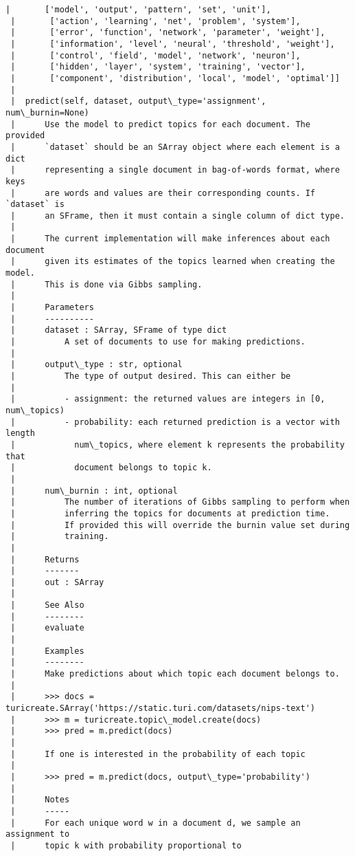 \documentclass[11pt]{ctexart}
\begin{document}
\begin{Verbatim}[commandchars=\\\{\}]
 |       ['model', 'output', 'pattern', 'set', 'unit'],
 |       ['action', 'learning', 'net', 'problem', 'system'],
 |       ['error', 'function', 'network', 'parameter', 'weight'],
 |       ['information', 'level', 'neural', 'threshold', 'weight'],
 |       ['control', 'field', 'model', 'network', 'neuron'],
 |       ['hidden', 'layer', 'system', 'training', 'vector'],
 |       ['component', 'distribution', 'local', 'model', 'optimal']]
 |  
 |  predict(self, dataset, output\_type='assignment', num\_burnin=None)
 |      Use the model to predict topics for each document. The provided
 |      `dataset` should be an SArray object where each element is a dict
 |      representing a single document in bag-of-words format, where keys
 |      are words and values are their corresponding counts. If `dataset` is
 |      an SFrame, then it must contain a single column of dict type.
 |      
 |      The current implementation will make inferences about each document
 |      given its estimates of the topics learned when creating the model.
 |      This is done via Gibbs sampling.
 |      
 |      Parameters
 |      ----------
 |      dataset : SArray, SFrame of type dict
 |          A set of documents to use for making predictions.
 |      
 |      output\_type : str, optional
 |          The type of output desired. This can either be
 |      
 |          - assignment: the returned values are integers in [0, num\_topics)
 |          - probability: each returned prediction is a vector with length
 |            num\_topics, where element k represents the probability that
 |            document belongs to topic k.
 |      
 |      num\_burnin : int, optional
 |          The number of iterations of Gibbs sampling to perform when
 |          inferring the topics for documents at prediction time.
 |          If provided this will override the burnin value set during
 |          training.
 |      
 |      Returns
 |      -------
 |      out : SArray
 |      
 |      See Also
 |      --------
 |      evaluate
 |      
 |      Examples
 |      --------
 |      Make predictions about which topic each document belongs to.
 |      
 |      >>> docs = turicreate.SArray('https://static.turi.com/datasets/nips-text')
 |      >>> m = turicreate.topic\_model.create(docs)
 |      >>> pred = m.predict(docs)
 |      
 |      If one is interested in the probability of each topic
 |      
 |      >>> pred = m.predict(docs, output\_type='probability')
 |      
 |      Notes
 |      -----
 |      For each unique word w in a document d, we sample an assignment to
 |      topic k with probability proportional to

\end{Verbatim}
\end{document}
